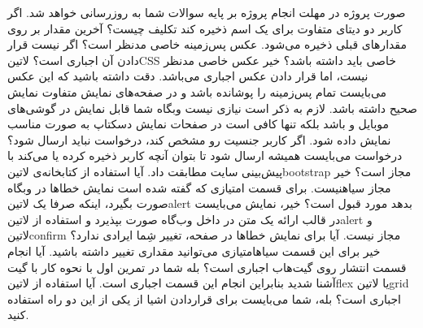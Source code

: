 \documentclass[../main.tex]{subfiles}
\begin{document}

صورت پروژه در مهلت انجام پروژه بر پایه سوالات شما به روزرسانی خواهد شد.
 اگر کاربر دو دیتای متفاوت برای یک اسم ذخیره کند تکلیف چیست؟
 آخرین مقدار بر روی مقدارهای قبلی ذخیره می‌شود.
 عکس پس‌زمینه خاصی مدنظر است؟ اگر نیست قرار دادن آن اجباری است؟ ‌لاتین{CSS} خاصی باید داشته باشد؟
 خیر عکس خاصی مدنظر نیست، اما قرار دادن عکس اجباری می‌باشد. دقت داشته باشید که این عکس می‌بایست تمام پس‌زمینه را پوشانده باشد و در صفحه‌های نمایش متفاوت نمایش صحیح داشته باشد. لازم به ذکر است نیازی نیست وبگاه شما قابل نمایش در گوشی‌های موبایل و  باشد بلکه تنها کافی است در صفحات نمایش دسکتاپ به صورت مناسب نمایش داده شود.
 اگر کاربر جنسیت رو مشخص کند، درخواست نباید ارسال شود؟
 درخواست می‌بایست همیشه ارسال شود تا بتوان آنچه کاربر ذخیره کرده یا می‌کند با پیش‌بینی سایت مطابقت داد.
 آیا استفاده از کتابخانه‌ی ‌لاتین{bootstrap} مجاز است؟
 خیر مجاز ‌سیاه{نیست}.
 برای قسمت امتیازی که گفته شده است نمایش خطاها در وبگاه صورت بگیرد، اینکه صرفا یک ‌لاتین{alert} بدهد مورد قبول است؟
 خیر، نمایش می‌بایست در قالب ارائه یک متن در داخل وب‌گاه صورت بپذیرد و استفاده از ‌لاتین{alert} و ‌لاتین{confirm} مجاز نیست.
 آیا برای نمایش خطاها در صفحه، تغییر شِما ایرادی ندارد؟
 خیر برای این قسمت ‌سیاه{امتیازی} می‌توانید مقداری تغییر داشته باشید.
 آیا انجام قسمت انتشار روی گیت‌هاب اجباری است؟
 بله شما در تمرین اول با نحوه کار با گیت آشنا شدید بنابراین انجام این قسمت اجباری است.
 آیا استفاده از ‌لاتین{flex} یا ‌لاتین{grid} اجباری است؟
 بله، شما می‌بایست برای قراردادن اشیا از یکی از این دو راه استفاده کنید.
\end{document}

